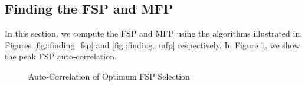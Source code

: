 \documentclass[conference,onecolumn]{IEEEtran}
\begin{document}


\subsection{Finding the FSP and MFP}

In this section, we compute the FSP and MFP using the algorithms illustrated in Figures \ref{fig::finding_fsp} and \ref{fig::finding_mfp} respectively. In Figure \ref{fig::fsp_correlation}, we show the peak FSP auto-correlation.

\begin{figure}[H]
	\centerline{}
	\caption{Auto-Correlation of Optimum FSP Selection}
	\label{fig::fsp_correlation}
\end{figure}
\end{document}
